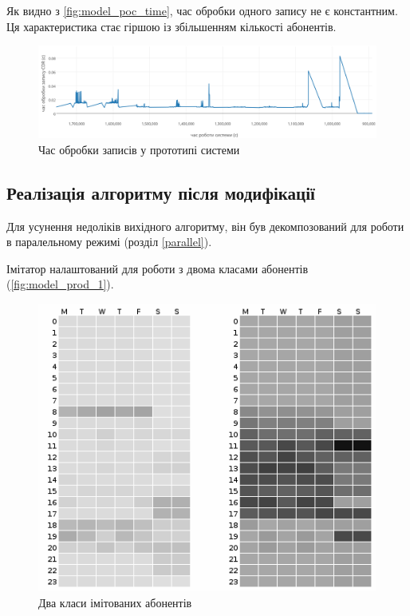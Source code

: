 Як видно з \autoref{fig:model_poc_time}, час обробки одного запису не є константним. Ця характеристика стає гіршою із збільшенням кількості абонентів.

\begin{figure}[h!]
        \begin{center}
            \includegraphics[scale=0.15]{resources/poc-time.png}
        \end{center}
        \caption{Час обробки записів у прототипі системи}
        \label{fig:model_poc_time}
\end{figure}

\subsection{Реалізація алгоритму після модифікації}

Для усунення недоліків вихідного алгоритму, він був декомпозований для роботи в паралельному режимі (розділ \ref{parallel}).

Імітатор налаштований для роботи з двома класами абонентів (\autoref{fig:model_prod_1}).

\begin{figure}[h!]
        \begin{center}
            \includegraphics[scale=0.6]{resources/model_2_1.png}
        \end{center}
        \caption{Два класи імітованих абонентів}
        \label{fig:model_prod_1}
\end{figure}

